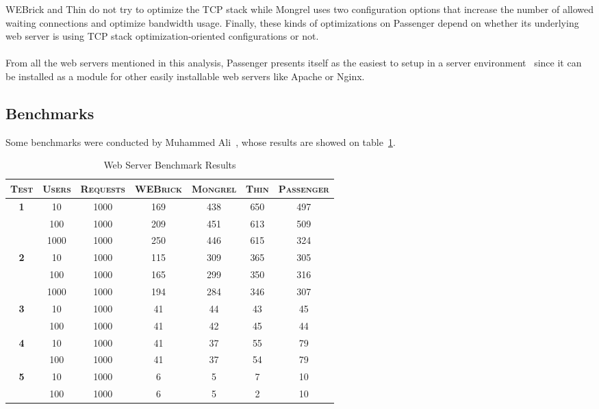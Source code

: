 WEBrick and Thin do not try to optimize the TCP stack while Mongrel uses two configuration options that increase the number of allowed waiting connections and optimize bandwidth usage. Finally, these kinds of optimizations on Passenger depend on whether its underlying web server is using TCP stack optimization-oriented configurations or not.\\\\%
From all the web servers mentioned in this analysis, Passenger presents itself as the easiest to setup in a server environment~\cite{ruby_webservers} since it can be installed as a module for other easily installable web servers like Apache or Nginx.

\subsection{Benchmarks}
Some benchmarks were conducted by Muhammed Ali~\cite{ruby_webservers}, whose results are showed on table~\ref{tab:webserver_benchmarks}.
\begin{table}[h!t]
  \centering
  \caption{Web Server Benchmark Results}
  \label{tab:webserver_benchmarks}
  
  \begin{tabular}{c|c|c|c|c|c|c}
    \textsc{\textbf{Test}} & \textsc{\textbf{Users}} & \textsc{\textbf{Requests}} & \textsc{\textbf{WEBrick}} & \textsc{\textbf{Mongrel}} & \textsc{\textbf{Thin}} & \textsc{\textbf{Passenger}} \\
  \hline

  \multirow{3}{*}{\textbf{1}}
  & 10 & 1000 & 169 & 438 & 650 & 497\\
  & 100 & 1000 & 209 & 451 & 613 & 509\\
  & 1000 & 1000 & 250 & 446 & 615 & 324\\
  \hline
    
  \multirow{3}{*}{\textbf{2}}
  & 10 & 1000 & 115 & 309 & 365 & 305\\
  & 100 & 1000 & 165 & 299 & 350 & 316\\
  & 1000 & 1000 & 194 & 284 & 346 & 307\\
  \hline
  
  \multirow{2}{*}{\textbf{3}}
  & 10 & 1000 & 41 & 44 & 43 & 45\\
  & 100 & 1000 & 41 & 42 & 45 & 44\\
  \hline

  \multirow{2}{*}{\textbf{4}}
  & 10 & 1000 & 41 & 37 & 55 & 79\\
  & 100 & 1000 & 41 & 37 & 54 & 79\\
  \hline
  
  \multirow{2}{*}{\textbf{5}}
  & 10 & 1000 & 6 & 5 & 7 & 10\\
  & 100 & 1000 & 6 & 5 & 2 & 10\\
  
  \end{tabular}
\end{table}

